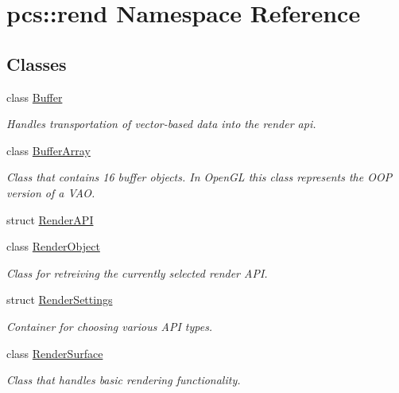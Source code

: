 \hypertarget{namespacepcs_1_1rend}{}\section{pcs\+:\+:rend Namespace Reference}
\label{namespacepcs_1_1rend}
\subsection*{Classes}
\begin{DoxyCompactItemize}
\item 
class \hyperlink{classpcs_1_1rend_1_1Buffer}{Buffer}
\begin{DoxyCompactList}\small\item\em Handles transportation of vector-\/based data into the render api. \end{DoxyCompactList}\item 
class \hyperlink{classpcs_1_1rend_1_1BufferArray}{Buffer\+Array}
\begin{DoxyCompactList}\small\item\em Class that contains 16 buffer objects. In Open\+GL this class represents the O\+OP version of a V\+AO. \end{DoxyCompactList}\item 
struct \hyperlink{structpcs_1_1rend_1_1RenderAPI}{Render\+A\+PI}
\item 
class \hyperlink{classpcs_1_1rend_1_1RenderObject}{Render\+Object}
\begin{DoxyCompactList}\small\item\em Class for retreiving the currently selected render A\+PI. \end{DoxyCompactList}\item 
struct \hyperlink{structpcs_1_1rend_1_1RenderSettings}{Render\+Settings}
\begin{DoxyCompactList}\small\item\em Container for choosing various A\+PI types. \end{DoxyCompactList}\item 
class \hyperlink{classpcs_1_1rend_1_1RenderSurface}{Render\+Surface}
\begin{DoxyCompactList}\small\item\em Class that handles basic rendering functionality. \end{DoxyCompactList}\end{DoxyCompactItemize}
